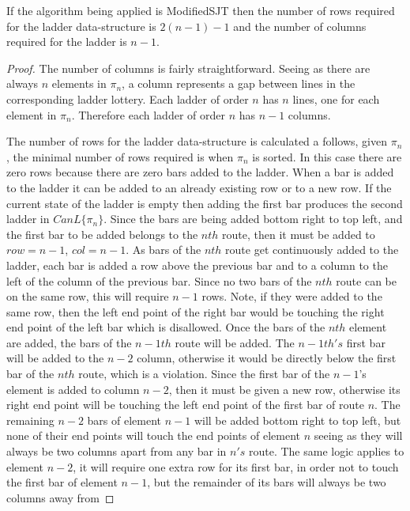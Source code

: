 \begin{theorem}
  If the algorithm being applied is {\sc ModifiedSJT} then the number of rows required for the ladder data-structure is $2(n-1) - 1$ 
  and the number of columns required for the ladder is $n-1$.
\end{theorem}
\begin{proof}
  The number of columns is fairly straightforward. Seeing as there are always $n$ elements in $\pi_{n}$, 
  a column represents a gap between lines in the corresponding ladder lottery. Each ladder of order $n$ has $n$ lines, 
  one for each element in $\pi_{n}$. Therefore each ladder of order $n$ has $n-1$ columns.\par 
  The number of rows for the ladder data-structure is calculated a follows, given $\pi_{n}$, the minimal 
  number of rows required is when $\pi_{n}$ is sorted. In this case there are zero rows because there are 
  zero bars added to the ladder. When a bar is added to the ladder it can be added to an already existing row 
  or to a new row. If the current state of the ladder is empty then adding the first bar produces the second ladder in
  $CanL\{\pi_{n}\}$. Since the bars are being added bottom right to top left, and the first bar to be added belongs 
  to the $nth$ route, then it must be added to $row=n-1$, $col=n-1$. As bars of the $nth$ route get 
  continuously added to the ladder, each bar is added a row above the previous bar and to a column 
  to the left of the column of the previous bar.
  Since no two bars of the $nth$ route can be on the same row, this will require $n-1$ rows. Note, if they were added to the same 
  row, then the left end point of the right bar would be touching the right end point of the left bar which is disallowed. Once the 
  bars of the $nth$ element are added, the bars of the $n-1th$ route will be added. The $n-1th's$ first bar 
  will be added to the $n-2$ column, otherwise it would be directly below the first bar of the $nth$ route, which is a violation. 
  Since the first bar of the $n-1$'s element is added to column $n-2$, then it must be given a new row, otherwise its right end point 
  will be touching  the left end point of the first bar of route $n$. The remaining $n-2$ bars of element $n-1$
  will be added bottom right to top left, but none of their end points will touch the end points of element $n$ seeing as they will 
  always be two columns apart from any bar in $n's$ route. The same logic applies to element $n-2$, it will require one extra row for its 
  first bar, in order not to touch the first bar of element $n-1$, but the remainder of its bars will always be two columns away from 

\end{proof}
